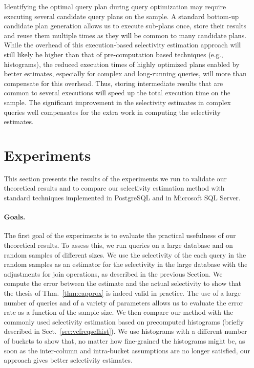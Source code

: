 Identifying the optimal query plan during query optimization may
require executing several candidate query plans on the sample. A standard
bottom-up candidate plan generation allows us to execute sub-plans once, store
their results and reuse them multiple times as they will be common to many
candidate plans. While the overhead of this execution-based selectivity
estimation approach will still likely be higher than that of pre-computation
based techniques (e.g., histograms),  the reduced execution times of highly
optimized plans enabled by better estimates, especially for complex and
long-running queries, will more than compensate for this overhead.   
Thus, storing intermediate results that are common to several executions will speed up
the total execution time on the sample. The significant improvement in the
selectivity estimates in complex queries well compensates for the extra work in
computing the selectivity estimates.

\section{Experiments}\label{sec:vcfreqexperiments}
This section presents the results of the experiments we run to validate our
theoretical results and to compare our selectivity estimation
method with standard techniques implemented in PostgreSQL and in
Microsoft SQL Server.

\paragraph{Goals.} The first goal of the experiments is to evaluate the practical
usefulness of our theoretical results. To assess this, we run queries on a large
database and on random samples of different sizes. We use the selectivity
of the each query in the random samples as an estimator for the selectivity in
the large database with the adjustments for join operations, as
described in the previous Section. We compute the error between the
estimate and the actual selectivity to show that the thesis of
Thm.~\ref{thm:eapprox} is indeed valid in practice. The use of a large number
of queries and of a variety of parameters allows us to evaluate the error
rate as a function of the sample size. We then compare our
method with the commonly used selectivity estimation based  on precomputed
histograms (briefly described in Sect.~\ref{sec:vcfreqselhist}). We use histograms
with a different number of buckets to show that, no matter how fine-grained the
histograms might be, as soon as the inter-column and intra-bucket assumptions
are no longer satisfied, our approach gives better selectivity
estimates.

